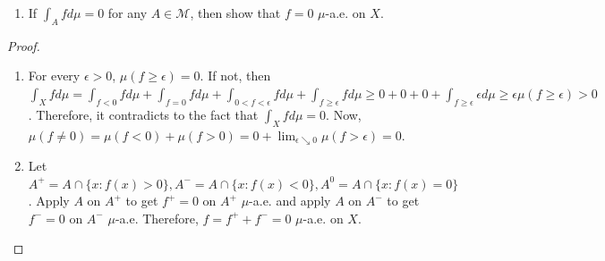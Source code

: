 \documentclass{article}
\begin{document}
\begin{enumerate}[font = \Large\bfseries\itshape\space, leftmargin = 3mm, labelsep = 3mm]
\begin{enumerate}[label=(\roman*)]
\item
If $\int_A fd\mu = 0$ for any $A \in \mathcal{M}$, then show that $f = 0$ $\mu$-a.e. on $X$.
\end{enumerate}

\begin{proof}
\begin{enumerate}[label=(\roman*)]
\item For every $\epsilon > 0$, $\mu(f \geq \epsilon) = 0$.
If not, then $\int_X f d\mu = \int_{f < 0} fd\mu + \int_{f = 0} fd\mu + \int_{0 < f < \epsilon} fd\mu + \int_{f\geq \epsilon} fd\mu
\geq 0 + 0 + 0 + \int_{f \geq \epsilon} \epsilon d\mu \geq \epsilon \mu(f \geq \epsilon) > 0$.
Therefore, it contradicts to the fact that $\int_X fd\mu = 0$.
Now, $\mu(f \neq 0) = \mu(f < 0) + \mu(f > 0) = 0 + \lim_{\epsilon \searrow 0} \mu(f > \epsilon) = 0$.

\item
Let $A^+ = A \cap \{ x : f(x) > 0\}, A^- = A \cap \{ x : f(x) < 0\}, A^0 = A \cap \{ x : f(x) = 0\}$.
Apply $A$ on $A^+$ to get $f^+ = 0$ on $A^+$ $\mu$-a.e. and apply $A$ on $A^-$ to get $f^- = 0$ on $A^-$ $\mu$-a.e.
Therefore, $f = f^+ + f^- = 0$ $\mu$-a.e. on $X$.
\end{enumerate}
\end{proof}

\end{enumerate}
\end{document}
